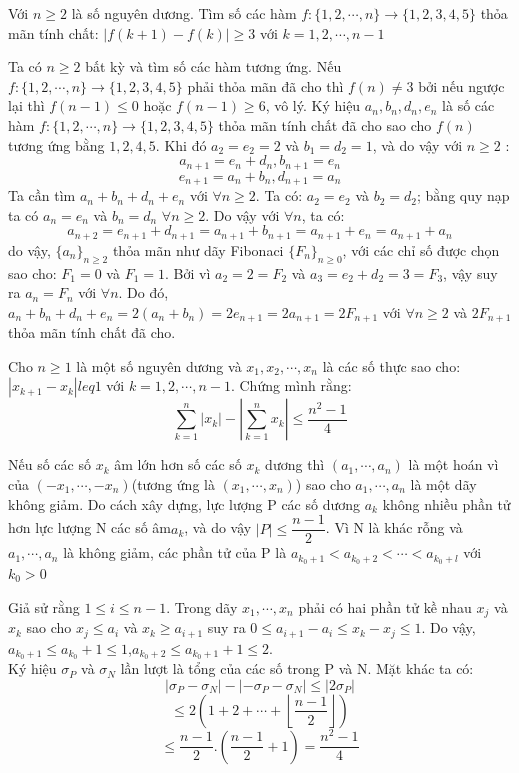 \begin{baitap}
Với $n \ge 2 $ là số nguyên dương. Tìm số các hàm $f:\{1,2,\cdots,n\} \rightarrow \{1,2,3,4,5\}$ thỏa mãn tính chất: $\left|f(k+1)-f(k)\right|\geq 3$ với $k=1,2,\cdots,n-1$

\begin{loigiai4}
Ta có $n\geq 2$ bất kỳ và tìm số các hàm tương ứng. Nếu $f:\{1,2,\cdots,n\}\rightarrow \{1,2,3,4,5\}$ phải thỏa mãn đã cho thì $f(n) \ne 3$ bởi nếu ngược lại thì $f(n-1)\leq 0$ hoặc $f(n-1) \geq 6$, vô lý. Ký hiệu $a_n,b_n,d_n,e_n$ là số các hàm $f:\{1,2,\cdots,n\}\rightarrow \{1,2,3,4,5\}$ thỏa mãn tính chất đã cho sao cho $f(n)$ tương ứng bằng $1,2,4,5$. Khi đó $a_2=e_2=2$ và $b_1=d_2=1$, và do vậy với $n\geq 2$ :\\
$$a_{n+1}=e_n+d_n, b_{n+1}=e_n$$
$$e_{n+1}=a_n+b_n, d_{n+1}=a_n$$
 Ta cần tìm $a_n+b_n+d_n+e_n$ với $\forall n\geq 2$. Ta có: $a_2=e_2$ và $b_2=d_2$; bằng quy nạp ta có $a_n=e_n$ và $b_n=d_n$ $\forall n\geq 2$. Do vậy với $\forall n$, ta có:\\
$$a_{n+2}=e_{n+1}+d_{n+1}=a_{n+1}+b_{n+1}=a_{n+1}+e_{n}=a_{n+1}+a_n$$
do vậy, $\{a_n\}_{n\geq2}$ thỏa mãn như dãy Fibonaci $\{F_n\}_{n\geq0}$, với các chỉ số được chọn sao cho: $F_1=0$ và $F_1=1$. Bởi vì $ a_2=2=F_2$ và $a_3=e_2+d_2=3=F_3$, vậy suy ra $ a_n=F_n$ với $\forall n$. Do đó,$a_n+b_n+d_n+e_n=2(a_n+b_n)=2e_{n+1}=2a_{n+1}=2F_{n+1}$ với $\forall n\geq 2$ và $2F_{n+1}$ thỏa mãn tính chất đã cho.
\end{loigiai4}
\end{baitap}

\begin{baitap}
Cho $n\geq 1$ là một số nguyên dương và $ x_1,x_2,\cdots,x_n$ là các số thực sao cho: $\left|x_{k+1}-x_k\right|leq 1$ với $k=1,2,\cdots,n-1$. Chứng mình rằng:
$$\sum\limits_{k=1}^{n}\left|x_k\right|-\left|\sum\limits_{k=1}^{n}x_k\right|\leq \dfrac{n^2-1}{4}$$

\begin{loigiai4}
Nếu số các số $x_k$ âm lớn hơn số các số $x_k$ dương thì  $(a_1,\cdots,a_n)$ là một hoán vì của $(-x_1,\cdots,-x_n)$(tương ứng là $(x_1,\cdots,x_n)$) sao cho $a_1,\cdots,a_n$ là một dãy không giảm.
Do cách xây dựng, lực lượng P các số dương $a_k$ không nhiều phần tử hơn lực lượng N các số âm$a_k$, và do vậy
$\left|P\right|\leq \dfrac{n-1}{2}$. Vì N là khác rỗng và $ a_1,\cdots,a_n$ là không giảm, các phần tử của P là $a_{k_0+1}<a_{k_0+2}<\cdots<a_{k_0+l}$ với $k_0> 0$

Giả sử rằng $1\leq i\leq n-1$. Trong dãy $x_1,\cdots,x_n$ phải có hai phần tử kề nhau $x_j$ và $x_k$ sao cho $x_j\leq a_i$ và $x_k \geq a_{i+1}$ suy ra $ 0\leq a_{i+1}-a_{i}\leq x_k-x_j\leq 1$. Do vậy, $a_{k_0+1}\leq a_{k_0}+1\leq 1$,$a_{k_0+2}\leq a_{k_0+1}+1 \leq 2$.\\
Ký hiệu $\sigma_{P}$ và $ \sigma_{N}$ lần lượt là tổng của các số trong P và N. Mặt khác ta có:
$$\left|\sigma_{P}-\sigma_{N}\right| -\left|-\sigma_{P}-\sigma_{N}\right|\leq \left|2\sigma_{P}\right|$$
$$\leq 2(1+2+\cdots+\left\lfloor\dfrac{n-1}{2}\right\rfloor)$$
$$\leq \dfrac{n-1}{2}.(\frac{n-1}{2}+1)=\dfrac{n^2-1}{4}$$
\end{loigiai4}
\end{baitap}

